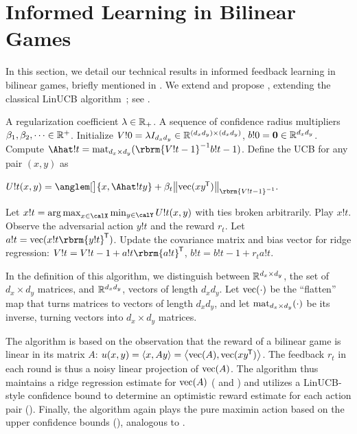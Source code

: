 \section{Informed Learning in Bilinear Games}\label{h1a:proof-purelinucb}

In this section, we detail our technical results in informed feedback learning in bilinear games, briefly mentioned in . We extend \PureUCB{} and propose \PureLinUCB{}, extending the classical LinUCB algorithm~\citep{abbasi-yadkori2011improved}; see .

\begin{algorithm}[h]
\caption{\PureLinUCB}\label{alg:pure-lin-ucb}
\begin{algorithmic}[1]
\Require A regularization coefficient $\lambda\in \mathbb{R}_+$. A sequence of confidence radius multipliers $\beta_1, \beta_2, \dots\in \mathbb{R}^+$.
\State Initialize $V!0=\lambda I_{d_x d_y}\in \mathbb{R}^{(d_x d_y)\times (d_x d_y)}$, $b!0=\mathbf{0}\in \mathbb{R}^{d_x d_y}$. \label{code:ridge-init}
  \State Compute $\Ahat!t=\mat_{d_x\times d_y}(\rbrm{V!{t-1}}^{-1} b!{t-1})$. \label{line:ridge}
  \State Define the UCB for any pair $(x,y)$ as\\
  \centerline{$U!t(x,y)=\anglem[\big]{x,\Ahat!t y}+\beta_t \norm{\vect (x y^\trans)}_{\rbrm{V!{t-1}}^{-1}}.$}\label{code:U-def}
  \State Let  $x!t = \argmax_{x\in \calX} \min_{y\in \calY} U!t(x,y)$ with ties broken arbitrarily.
  \label{line:pure_maximin}
  \State Play $x!t$. Observe the adversarial action $y!t$ and the reward $r_t$.
  \State Let $a!t = \vect(x!t \rbrm{y!t}^\trans)$.
  \State Update the covariance matrix and bias vector for ridge regression: $V!t=V!{t-1}+a!t \rbrm{a!t}^\trans$, $b!t=b!{t-1}+r_t a!t$. \label{code:ridge-update}
\EndFor
\end{algorithmic}
\end{algorithm}


In the definition of this algorithm, we distinguish between $\mathbb{R}^{d_x\times d_y}$, the set of $d_x\times d_y$ matrices, and $\mathbb{R}^{d_x d_y}$, vectors of length $d_x d_y$. Let $\operatorname{vec}(\cdot)$ be the ``flatten'' map that turns matrices to vectors of length $d_x d_y$, and let $\operatorname{mat}_{d_x\times d_y}(\cdot)$ be its inverse, turning vectors into $d_x\times d_y$ matrices. 


The algorithm is based on the observation that the reward of a bilinear game is linear in its matrix $A$: $u(x,y)=\inner{x}{Ay}=\inner{\vect(A)}{\vect(x y^\trans)}$. The feedback $r_t$ in each round is thus a noisy linear projection of $\operatorname{vec}(A)$. 
The algorithm thus maintains a ridge regression estimate for $\operatorname{vec}(A)$ ( and ) and utilizes a LinUCB-style confidence bound to determine an optimistic reward estimate for each action pair (). 
Finally, the algorithm again plays the pure maximin action based on the upper confidence bounds (), analogous to \PureUCB.

